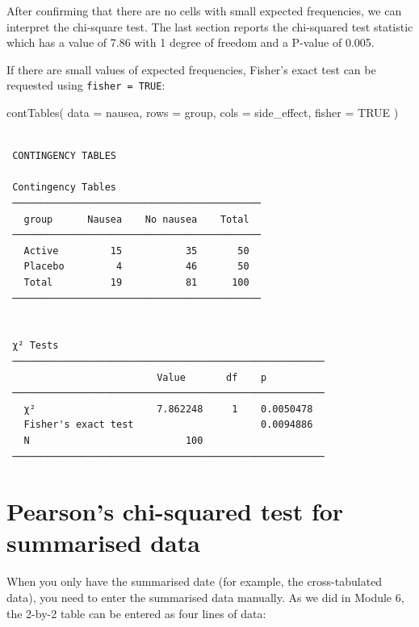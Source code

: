 \documentclass[
  a4paper,
]{memoir}
\newenvironment{Shaded}{\begin{snugshade}}{\end{snugshade}}
\newcommand{\AttributeTok}[1]{\textcolor[rgb]{0.00,0.00,0.00}{#1}}
\newcommand{\ConstantTok}[1]{\textcolor[rgb]{0.00,0.00,0.00}{#1}}
\newcommand{\FunctionTok}[1]{\textcolor[rgb]{0.00,0.00,0.00}{#1}}
\newcommand{\NormalTok}[1]{\textcolor[rgb]{0.00,0.00,0.00}{#1}}
\begin{document}
After confirming that there are no cells with small expected
frequencies, we can interpret the chi-square test. The last section
reports the chi-squared test statistic which has a value of 7.86 with 1
degree of freedom and a P-value of 0.005.

If there are small values of expected frequencies, Fisher's exact test
can be requested using \texttt{fisher\ =\ TRUE}:

\begin{Shaded}
\begin{Highlighting}[]
\FunctionTok{contTables}\NormalTok{(}
    \AttributeTok{data =}\NormalTok{ nausea,}
    \AttributeTok{rows =}\NormalTok{ group, }\AttributeTok{cols =}\NormalTok{ side\_effect,}
    \AttributeTok{fisher =} \ConstantTok{TRUE}
\NormalTok{)}
\end{Highlighting}
\end{Shaded}

\begin{verbatim}

 CONTINGENCY TABLES

 Contingency Tables                          
 ─────────────────────────────────────────── 
   group      Nausea    No nausea    Total   
 ─────────────────────────────────────────── 
   Active         15           35       50   
   Placebo         4           46       50   
   Total          19           81      100   
 ─────────────────────────────────────────── 


 χ² Tests                                               
 ────────────────────────────────────────────────────── 
                          Value       df    p           
 ────────────────────────────────────────────────────── 
   χ²                     7.862248     1    0.0050478   
   Fisher's exact test                      0.0094886   
   N                           100                      
 ────────────────────────────────────────────────────── 
\end{verbatim}

\section{Pearson's chi-squared test for summarised
data}\label{pearsons-chi-squared-test-for-summarised-data-1}

When you only have the summarised date (for example, the cross-tabulated
data), you need to enter the summarised data manually. As we did in
Module 6, the 2-by-2 table can be entered as four lines of data:
\end{document}
